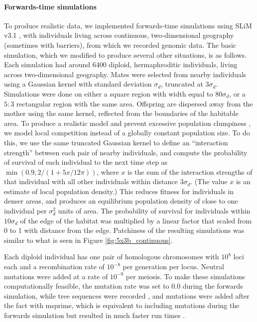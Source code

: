 \documentclass{article}
\begin{document}
\paragraph{Forwards-time simulations}
To produce realistic data, we implemented forwards-time simulations using SLiM v3.1 
\citep{haller2018forward,haller2019treesequence},
with individuals living across continuous, two-dimensional geography (sometimes with barriers),
from which we recorded genomic data.
The basic simulation, which we modified to produce several other situations,
is as follows.
Each simulation had around 6400 diploid, hermaphroditic individuals, 
living across two-dimensional geography.
Mates were selected from nearby individuals using a Gaussian kernel with standard deviation $\sigma_d$,
truncated at $3 \sigma_d$.
Simulations were done on either a square region with width equal to $80\sigma_d$,
or a $5:3$ rectangular region with the same area.
Offspring are dispersed away from the mother using the same kernel,
reflected from the boundaries of the habitable area.
To produce a realistic model and prevent excessive population clumpiness \citep{felsensten1975pain}, 
we model local competition instead of a globally constant population size.
To do this, 
we use the same truncated Gaussian kernel to define an ``interaction strength''
between each pair of nearby individuals, 
and compute the probability of survival of each individual to the next time step as
$\min(0.9, 2 / (1 +  5x/12 \pi))$,
where $x$ is the sum of the interaction strengths of that individual with all other individuals
within distance $3 \sigma_d$.
(The value $x$ is an estimate of local population density.)
This reduces fitness for individuals in denser areas,
and produces an equilibrium population density
of close to one individual per $\sigma_d^2$ units of area.
The probability of survival for individuals within $10\sigma_d$ of the edge of the habitat
was multiplied by a linear factor that scaled from 0 to 1 with distance from the edge.
Patchiness of the resulting simulations was similar to what is seen in 
Figure \ref{fig:5x3b_continuous}.

Each diploid individual has one pair of homologous chromosomes with $10^8$ loci each 
and a recombination rate of $10^{-8}$ per generation per locus.
Neutral mutations were added at a rate of $10^{-9}$ per meiosis.
To make these simulations computationally feasible,
the mutation rate was set to 0.0 during the forwards simulation,
while tree sequences were recorded \citep{haller2019treesequence},
and mutations were added after the fact with msprime,
which is equivalent to including mutations during the forwards simulation 
but resulted in much faster run times \citep{kelleher2018efficient}.
\end{document}
